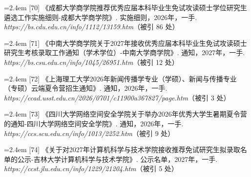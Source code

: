 {\vspace{0.6pt}
\vspace{3.5pt}\par
\nopagebreak\vspace{1pt}
\noindent\hangindent=2.4em \label{src:S0079}{\color{cAccent}[70]} 《成都大学商学院推荐优秀应届本科毕业生免试攻读硕士学位研究生遴选工作实施细则-成都大学商学院》. 实施细则，2026年，一手. \textit{https://bs.cdu.edu.cn/info/1112/13159.htm}（被引 86 处）\par
\vspace{0.6pt}
\vspace{3.5pt}\par
\nopagebreak\vspace{1pt}
\noindent\hangindent=2.4em \label{src:S0080}{\color{cAccent}[71]} 《中南大学商学院关于2027年接收优秀应届本科毕业生免试攻读硕士研究生考核录取工作通知（学术学位）-中南大学商学院》. 通知，2027年，一手. \textit{https://bs.csu.edu.cn/info/1045/26951.htm}（被引 12 处）\par
\vspace{0.6pt}
\vspace{3.5pt}\par
\nopagebreak\vspace{1pt}
\noindent\hangindent=2.4em \label{src:S0081}{\color{cAccent}[72]} 《上海理工大学2026年新闻传播学专业（学硕）、新闻与传播专业（专硕）云端夏令营招生通知》. 通知，2026年，一手. \textit{https://ccad.usst.edu.cn/2026/0701/c11900a367827/page.htm}（被引 3 处）\par
\vspace{0.6pt}
\vspace{3.5pt}\par
\nopagebreak\vspace{1pt}
\noindent\hangindent=2.4em \label{src:S0083}{\color{cAccent}[73]} 《四川大学网络空间安全学院关于举办2026年优秀大学生暑期夏令营的通知-四川大学网络空间安全学院》. 通知，2026年，一手. \textit{https://ccs.scu.edu.cn/info/1013/2252.htm}（被引 9 处）\par
\vspace{0.6pt}
\vspace{3.5pt}\par
\nopagebreak\vspace{1pt}
\noindent\hangindent=2.4em \label{src:S0086}{\color{cAccent}[74]} 《关于对2027年计算机科学与技术学院接收推荐免试研究生拟录取名单的公示-吉林大学计算机科学与技术学院》. 公示名单，2027年，一手. \textit{https://ccst.jlu.edu.cn/info/1229/21204.htm}（被引 5 处）\par
}
